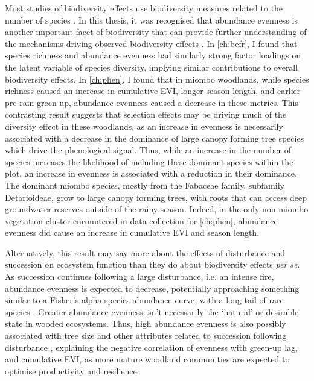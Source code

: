 \begin{refsection}
Most studies of biodiversity effects use biodiversity measures related to the number of species \citep{Tilman2014}. In this thesis, it was recognised that abundance evenness is another important facet of biodiversity that can provide further understanding of the mechanisms driving observed biodiversity effects \citep{Chalcraft2004}. In \autoref{ch:befr}, I found that species richness and abundance evenness had similarly strong factor loadings on the latent variable of species diversity, implying similar contributions to overall biodiversity effects. In \autoref{ch:phen}, I found that in miombo woodlands, while species richness caused an increase in cumulative EVI, longer season length, and earlier pre-rain green-up, abundance evenness caused a decrease in these metrics. This contrasting result suggests that selection effects may be driving much of the diversity effect in these woodlands, as an increase in evenness is necessarily associated with a decrease in the dominance of large canopy forming tree species which drive the phenological signal. Thus, while an increase in the number of species increases the likelihood of including these dominant species within the plot, an increase in evenness is associated with a reduction in their dominance. The dominant miombo species, mostly from the Fabaceae family, subfamily Detarioideae, grow to large canopy forming trees, with roots that can access deep groundwater reserves outside of the rainy season. Indeed, in the only non-miombo vegetation cluster encountered in data collection for \autoref{ch:phen}, abundance evenness did cause an increase in cumulative EVI and season length.

Alternatively, this result may say more about the effects of disturbance and succession on ecosystem function than they do about biodiversity effects \textit{per se}. As succession continues following a large disturbance, i.e. an intense fire, abundance evenness is expected to decrease, potentially approaching something similar to a Fisher's alpha species abundance curve, with a long tail of rare species \citep{Morozov2008, Sheil2001}. Greater abundance evenness isn't necessarily the `natural' or desirable state in wooded ecosystems. Thus, high abundance evenness is also possibly associated with tree size and other attributes related to succession following disturbance \citep{Holdo2006}, explaining the negative correlation of evenness with green-up lag, and cumulative EVI, as more mature woodland communities are expected to optimise productivity and resilience.


\end{refsection}
